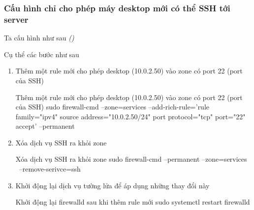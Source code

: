 \subsubsection{Cấu hình chỉ cho phép máy desktop mới có thể SSH tới server}

Ta cấu hình như sau \textit{()}


Cụ thể các bước như sau
\begin{enumerate}
  \item Thêm một rule mới cho phép desktop (10.0.2.50) vào zone có port 22 (port của SSH)\\
        \begin{coding}[gobble=10]{Thêm một rule mới cho phép desktop (10.0.2.50) vào zone có port 22 (port của SSH)}
          sudo firewall-cmd --zone=services --add-rich-rule='rule family="ipv4" source address="10.0.2.50/24" port protocol="tcp" port="22" accept' --permanent
        \end{coding}
  \item Xóa dịch vụ SSH ra khỏi zone\\
        \begin{coding}[gobble=10]{Xóa dịch vụ SSH ra khỏi zone}
          sudo firewall-cmd --permanent --zone=services \ --remove-serivce=ssh
        \end{coding}
  \item Khởi động lại dịch vụ tường lửa để áp dụng những thay đổi này\\
        \begin{coding}[gobble=10]{Khởi động lại firewalld sau khi thêm rule mới}
          sudo systemctl restart firewalld
        \end{coding}
\end{enumerate}


